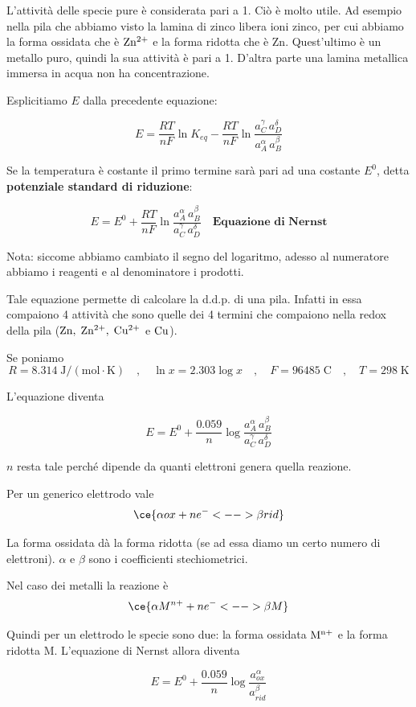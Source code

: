 L'attività delle specie pure è considerata pari a 1. Ciò è molto utile. Ad esempio nella pila che abbiamo visto la lamina di zinco libera ioni zinco, per cui abbiamo la forma ossidata che è $\rm Zn^{2+}$ e la forma ridotta che è Zn. Quest'ultimo è un metallo puro, quindi la sua attività è pari a 1. D'altra parte una lamina metallica immersa in acqua non ha concentrazione.

Esplicitiamo $E$ dalla precedente equazione:

$$E=\frac{RT}{nF}\ln K_{eq} - \frac{RT}{nF}\ln \frac{a_C^{\gamma} \, a_D^{\delta}}{a_A^{\alpha} \, a_B^{\beta}}$$

Se la temperatura è costante il primo termine sarà pari ad una costante $E^0$, detta \textbf{potenziale standard di riduzione}:

$$E= E^0 + \frac{RT}{nF}\ln \frac{a_A^{\alpha} \, a_B^{\beta}}{a_C^{\gamma} \, a_D^{\delta}} \quad \textbf{Equazione di Nernst}$$

Nota: siccome abbiamo cambiato il segno del logaritmo, adesso al numeratore abbiamo i reagenti e al denominatore i prodotti.

Tale equazione permette di calcolare la d.d.p. di una pila. Infatti in essa compaiono 4 attività che sono quelle dei 4 termini che compaiono nella redox della pila ($\rm Zn, \; Zn^{2+}, \; Cu^{2+}$ e $\rm Cu$).

Se poniamo
$$R=8.314 \; \text{J}/(\text{mol} \cdot \text{K})
\quad,\quad
\ln x=2.303 \log x
\quad,\quad
F=96485 \; \text{C}
\quad,\quad
T=298 \; \text{K}$$

L'equazione diventa

$$E = E^0 + \frac{0.059}{n}\log \frac{a_A^{\alpha} \, a_B^{\beta}}{a_C^{\gamma} \, a_D^{\delta}}$$

$n$ resta tale perché dipende da quanti elettroni genera quella reazione.

\vspace{0.2cm}Per un generico elettrodo vale
$$\ce{\alpha ox + ne^- <--> \beta rid}$$

La forma ossidata dà la forma ridotta (se ad essa diamo un certo numero di elettroni). $\alpha$ e $\beta$ sono i coefficienti stechiometrici.

Nel caso dei metalli la reazione è
$$\ce{\alpha M^{n+} + ne^- <--> \beta M}$$

Quindi per un elettrodo le specie sono due: la forma ossidata $\rm M^{n+}$ e la forma ridotta M. L'equazione di Nernst allora diventa

$$E = E^0 + \frac{0.059}{n}\log \frac{a_{ox}^{\alpha}}{a_{rid}^{\beta}}$$

